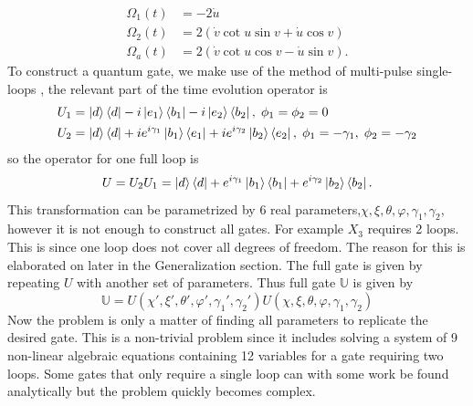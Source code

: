\begin{equation}
\begin{aligned}
\Omega_1(t) &= -2\dot{u}
\\ 
\Omega_2(t) &= 2\left(\dot{v}\cot u\sin v + \dot{u}\cos v \right)
\\
\Omega_a(t) &= 2\left(\dot{v}\cot u\cos v - \dot{u}\sin v \right).
\end{aligned}
\end{equation}
To construct a quantum gate, we make use of the method of multi-pulse single-loops \cite{sLoop}, the relevant part of the time evolution operator is
\begin{equation}
\begin{aligned}&
U_1 = \ket{d}\bra{d} -i\ket{e_1}\bra{b_1} -i\ket{e_2}\bra{b_2},\; \phi_1 = \phi_2 = 0
\\&
U_2 = \ket{d}\bra{d} +ie^{i\gamma_1}\ket{b_1}\bra{e_1} +ie^{i\gamma_2}\ket{b_2}\bra{e_2},\; \phi_1 = -\gamma_1,\; \phi_2 = -\gamma_2
\end{aligned}
\end{equation}
so the operator for one full loop is 
\begin{equation}
\label{eq:trit-gate-1-loop}
U = U_2U_1 = \ket{d}\bra{d} + e^{i\gamma_1}\ket{b_1}\bra{b_1} + e^{i\gamma_2}\ket{b_2}\bra{b_2}.
\end{equation}
This transformation can be parametrized by $6$ real parameters,$\chi,\xi,\theta,\varphi,\gamma_1,\gamma_2$, however it is not enough to construct all gates. For example $X_3$ requires 2 loops. This is since one loop does not cover all degrees of freedom. The reason for this is elaborated on later in the Generalization section. The full gate is given by repeating $U$ with another set of parameters. Thus full gate $\mathbb{U}$ is given by 
\begin{equation}
\label{eq:trit-gate-2-loop}
\mathbb{U} = U(\chi',\xi',\theta',\varphi',\gamma_1',\gamma_2') U(\chi,\xi,\theta,\varphi,\gamma_1,\gamma_2)
\end{equation}
Now the problem is only a matter of finding all parameters to replicate the desired gate. This is a non-trivial problem since it includes solving a system of 9 non-linear algebraic equations containing 12 variables for a gate requiring two loops. Some gates that only require a single loop can with some work be found analytically but the problem quickly becomes complex.

